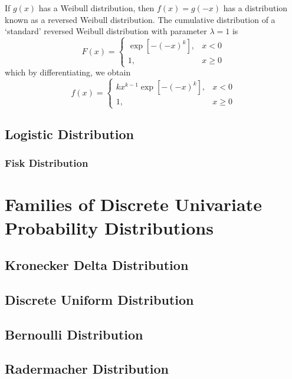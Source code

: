 \documentclass[11pt]{report} %
\begin{document}
If $g\left(x\right)$ has a Weibull distribution, then $f\left(x\right) = g\left(-x\right)$ has a distribution known as a reversed Weibull distribution. The cumulative distribution of a `standard' reversed Weibull distribution with parameter $\lambda = 1$ is
\begin{equation}
F\left(x\right) = \begin{cases} \exp\left[-\left(-x\right)^{k}\right], & x < 0 \\ 1, & x \geq 0 \end{cases}
\end{equation}
which by differentiating, we obtain
\begin{equation}
f\left(x\right) = \begin{cases} kx^{k - 1}\exp\left[-\left(-x\right)^{k}\right], & x < 0 \\ 1, & x \geq 0 \end{cases}
\end{equation}

\subsection{Logistic Distribution}

\subsubsection{Fisk Distribution}

\section{Families of Discrete Univariate Probability Distributions}

\subsection{Kronecker Delta Distribution}

\subsection{Discrete Uniform Distribution}

\subsection{Bernoulli Distribution}

\subsection{Radermacher Distribution}
\end{document}
